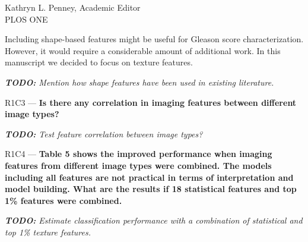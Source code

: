 \documentclass{letter}
\newcommand{\TODO}[1]{{\emph{\textbf{TODO:} #1}}}
\newenvironment{comment}[1]%
  {\vspace{5ex}\par\textsf{#1 ---}\ignorespaces\bfseries}%
  {\par\ignorespacesafterend}
\newenvironment{reply}%
  {\vspace{2ex}\par}%
  {\par\upshape}
\begin{document}
\begin{letter}{Kathryn L. Penney, Academic Editor \\ PLOS ONE}
\begin{reply}
Including shape-based features might be useful for Gleason score
characterization. However, it would require a considerable amount of additional
work. In this manuscript we decided to focus on texture features.

\TODO{Mention how shape features have been used in existing literature.}
\end{reply}


\begin{comment}{R1C3}
Is there any correlation in imaging features between different image types?
\end{comment}

\begin{reply}
\TODO{Test feature correlation between image types?}
\end{reply}


\begin{comment}{R1C4}
Table 5 shows the improved performance when imaging features from different
image types were combined. The models including all features are not practical
in terms of interpretation and model building. What are the results if 18
statistical features and top 1\% features were combined.
\end{comment}

\begin{reply}
\TODO{Estimate classification performance with a combination of statistical and
top 1\% texture features.}
\end{reply}



\end{letter}
\end{document}
